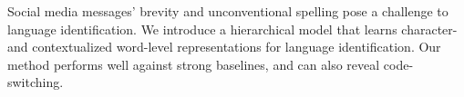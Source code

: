 Social media messages' brevity and unconventional spelling pose a challenge to language identification.  We introduce a hierarchical model that learns character- and contextualized word-level representations for language identification.  Our method performs well against strong baselines, and can also reveal code-switching.
